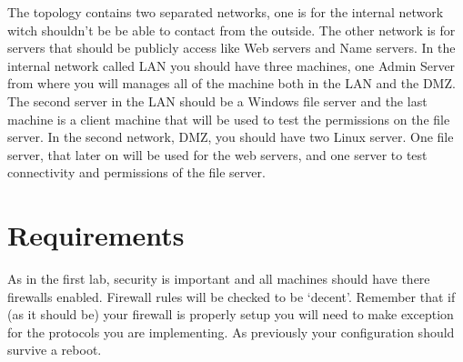 \documentclass[paper=a4, fontsize=11pt]{report} %
\begin{document}
The topology contains two separated networks, one is for the internal network witch shouldn't be be able to contact from the outside. The other network is for servers that should be publicly access like Web servers and Name servers. In the internal network called LAN you should have three machines, one Admin Server from where you will manages all of the machine both in the LAN and the DMZ. The second server in the LAN should be a Windows file server and the last machine is a client machine that will be used to test the permissions on the file server. In the second network, DMZ, you should have two Linux server. One file server, that later on will be used for the web servers, and one server to test connectivity and permissions of the file server.

\pagebreak

\section{Requirements}
\label{tasks}
As in the first lab, security is important and all machines should have there firewalls enabled. Firewall rules will be checked to be ‘decent’. Remember that if (as it should be) your firewall is properly setup you will need to make exception for the protocols you are implementing.
As previously your configuration should survive a reboot.
\end{document}
